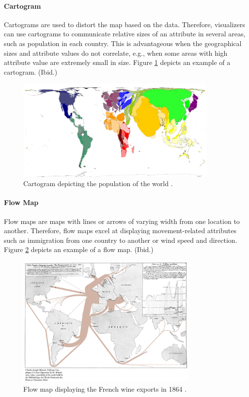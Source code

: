 \paragraph{Cartogram}

Cartograms are used to distort the map based on the data. Therefore, visualizers can use cartograms to communicate relative sizes of an attribute in several areas, such as population in each country. This is advantageous when the geographical sizes and attribute values do not correlate, e.g., when some areas with high attribute value are extremely small in size. Figure \ref{fig:cartogram} depicts an example of a cartogram. (Ibid.)

\begin{figure}[htbp]
  \begin{center}
    \includegraphics[width=10cm]{images/cartogram-example.png}
    \caption{Cartogram depicting the population of the world \citep{hennig_population_2014}.}
    \label{fig:cartogram}
  \end{center}
\end{figure}

\paragraph{Flow Map}

Flow maps are maps with lines or arrows of varying width from one location to another. Therefore, flow maps excel at displaying movement-related attributes such as immigration from one country to another or wind speed and direction. Figure \ref{fig:flow} depicts an example of a flow map. (Ibid.)

\begin{figure}[htbp]
  \begin{center}
    \includegraphics[width=9cm]{images/flow-example.jpg}
    \caption{Flow map displaying the French wine exports in 1864 \citep{minard_carte_1865}.}
    \label{fig:flow}
  \end{center}
\end{figure}

